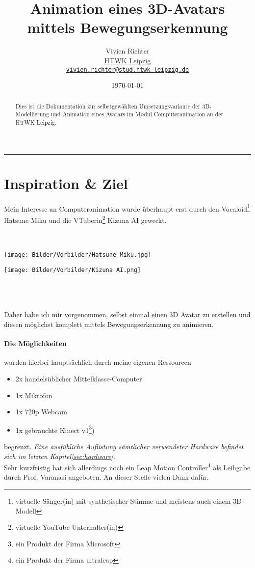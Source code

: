 \documentclass[a4paper, 12pt]{article}
\title{Animation eines 3D-Avatars mittels Bewegungserkennung}
\author{
    \Large Vivien Richter \\ [2mm]
    \normalsize \href{https://www.htwk-leipzig.de}{HTWK Leipzig} \\ \texttt{\href{mailto:vivien.richter@stud.htwk-leipzig.de}{vivien.richter@stud.htwk-leipzig.de}}}
\date{\today{}}
\begin{document}
\pagestyle{main}
\maketitle
\begin{abstract}
    Dies ist die Dokumentation zur selbstgewählten Umsetzungsvariante
    der 3D-Modellierung und Animation eines Avatars
    im Modul \glqq{}Computeranimation\grqq{} an der HTWK Leipzig.
\end{abstract}
\mbox{}\hrule\mbox{}
\tableofcontents
\clearpage
\listoffigures %
\newpage

\section{Inspiration \& Ziel}
\label{sec:inspiration}
Mein Interesse an Computeranimation wurde überhaupt erst durch
den Vocaloid\footnote{virtuelle Sänger(in) mit synthetischer Stimme und meistens auch einem 3D-Modell} Hatsune Miku
und die VTuberin\footnote{virtuelle YouTube Unterhalter(in)} Kizuna AI geweckt.
\\\\\\
\begin{minipage}[c]{0.5\textwidth}
    \centering
    \texttt{[image: Bilder/Vorbilder/Hatsune Miku.jpg]}
\end{minipage}
\begin{minipage}[c]{0.5\textwidth}
    \centering
    \texttt{[image: Bilder/Vorbilder/Kizuna AI.png]}
\end{minipage}
\\\\\\Daher habe ich mir vorgenommen,
selbst einmal einen 3D Avatar zu erstellen
und diesen möglichst komplett mittels Bewegungserkennung zu animieren.
\paragraph{Die Möglichkeiten} wurden hierbei hauptsächlich durch
meine eigenen Ressourcen
\begin{itemize}
    \item 2x handelsüblicher Mittelklasse-Computer
    \item 1x Mikrofon
    \item 1x 720p Webcam
    \item 1x gebrauchte Kinect v1\footnote{ein Produkt der Firma Microsoft})
\end{itemize}
begrenzt.
\textit{Eine ausfühliche Auflistung sämtlicher verwendeter Hardware befindet sich im letzten Kapitel\ref{sec:hardware}.}
\\Sehr kurzfristig hat sich allerdings noch ein Leap Motion Controller\footnote{ein Produkt der Firma ultraleap}
als Leihgabe durch Prof. Varanasi angeboten.
An dieser Stelle vielen Dank dafür.
\newpage
\end{document}

